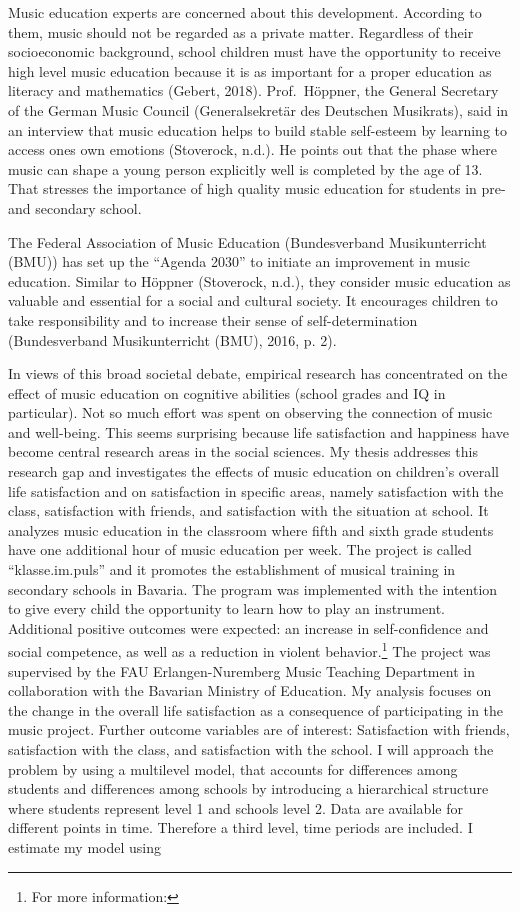 \documentclass[a4, 12pt]{article}
\let\rmarkdownfootnote\footnote%
\def\footnote{\protect\rmarkdownfootnote}
\begin{document}
Music education experts are concerned about this development. According to them, music should not be regarded as a private matter. Regardless of their socioeconomic background, school children must have the opportunity to receive high level music education because it is as important for a proper education as literacy and mathematics (Gebert, 2018). Prof.~Höppner, the General Secretary of the German Music Council (Generalsekretär des Deutschen Musikrats), said in an interview that music education helps to build stable self-esteem by learning to access ones own emotions (Stoverock, n.d.). He points out that the phase where music can shape a young person explicitly well is completed by the age of 13. That stresses the importance of high quality music education for students in pre- and secondary school.

The Federal Association of Music Education (Bundesverband Musikunterricht (BMU)) has set up the ``Agenda 2030'' to initiate an improvement in music education. Similar to Höppner (Stoverock, n.d.), they consider music education as valuable and essential for a social and cultural society. It encourages children to take responsibility and to increase their sense of self-determination (Bundesverband Musikunterricht (BMU), 2016, p. 2).

In views of this broad societal debate, empirical research has concentrated on the effect of music education on cognitive abilities (school grades and IQ in particular). Not so much effort was spent on observing the connection of music and well-being. This seems surprising because life satisfaction and happiness have become central research areas in the social sciences. My thesis addresses this research gap and investigates the effects of music education on children's overall life satisfaction and on satisfaction in specific areas, namely satisfaction with the class, satisfaction with friends, and satisfaction with the situation at school. It analyzes music education in the classroom where fifth and sixth grade students have one additional hour of music education per week. The project is called ``klasse.im.puls'' and it promotes the establishment of musical training in secondary schools in Bavaria. The program was implemented with the intention to give every child the opportunity to learn how to play an instrument. Additional positive outcomes were expected: an increase in self-confidence and social competence, as well as a reduction in violent behavior.\footnote{For more information:} The project was supervised by the FAU Erlangen-Nuremberg Music Teaching Department in collaboration with the Bavarian Ministry of Education.
My analysis focuses on the change in the overall life satisfaction as a consequence of participating in the music project. Further outcome variables are of interest: Satisfaction with friends, satisfaction with the class, and satisfaction with the school. I will approach the problem by using a multilevel model, that accounts for differences among students and differences among schools by introducing a hierarchical structure where students represent level 1 and schools level 2. Data are available for different points in time. Therefore a third level, time periods are included. I estimate my model using
\end{document}
